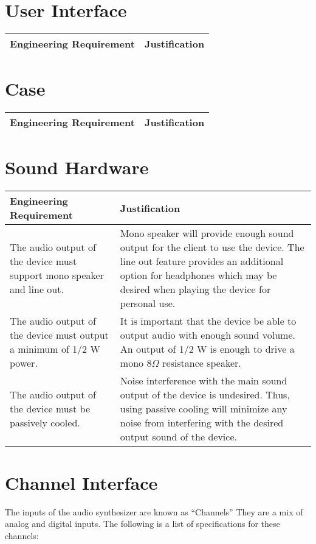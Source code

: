 \documentclass{article}
\begin{document}
\section{User Interface}

\begin{tabular}{|p{3in}|p{3in}|}
\hline
Engineering Requirement & Justification \\
\hline
\end{tabular}

\section{Case}

\begin{tabular}{|p{3in}|p{3in}|}
\hline
Engineering Requirement & Justification \\
\hline
\end{tabular}


\section{Sound Hardware}

\begin{tabular}{|p{3in}|p{3in}|}
\hline
Engineering Requirement & Justification \\
\hline
The audio output of the device must support mono speaker and line out.&Mono speaker will provide enough sound output for the client to use the device.  The line out feature provides an additional option for headphones which may be desired when playing the device for personal use.\\
\hline
The audio output of the device must output a minimum of 1/2 W power.&It is important that the device be able to output audio with enough sound volume.  An output of 1/2 W is enough to drive a mono 8${\Omega}$ resistance speaker.\\
\hline
The audio output of the device must be passively cooled.&Noise interference with the main sound output of the device is undesired.  Thus, using passive cooling will minimize any noise from interfering with the desired output sound of the device.\\
\hline
\end{tabular}


\section{Channel Interface}

The inputs of the audio synthesizer are known as ``Channels'' They are
a mix of analog and digital inputs. The following is a list of
specifications for these channels:
\end{document}
